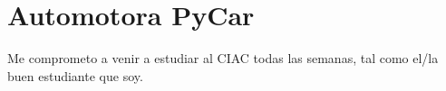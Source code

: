 \section{Automotora PyCar}

Me comprometo a venir a estudiar al CIAC todas las semanas, tal como el/la buen estudiante que soy.


